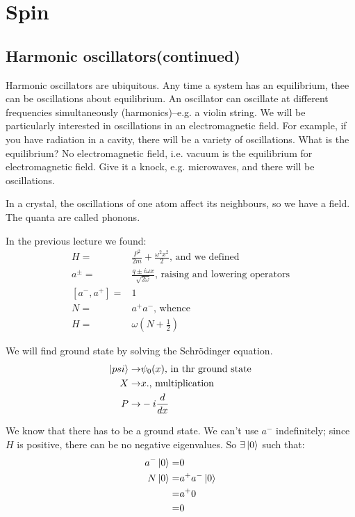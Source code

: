\documentclass[]{article}
\begin{document}
\section{Spin}

\subsection{Harmonic oscillators(continued)}

Harmonic oscillators are ubiquitous. Any time a system has an equilibrium, thee can be oscillations about equilibrium. An oscillator can oscillate at different frequencies simultaneously (harmonics)--e.g. a violin string. We will be particularly interested in oscillations in an electromagnetic field.  For example, if you have radiation in a cavity, there will be a variety of oscillations. What is the equilibrium? No electromagnetic field, i.e. vacuum is the equilibrium for electromagnetic field. Give it a knock, e.g. microwaves, and there will be oscillations.

In a crystal, the oscillations of one atom affect its neighbours, so we have a field. The quanta are called phonons.

In the previous lecture we found:
\begin{align*}
	H =& \frac{P^2}{2m} + \frac{\omega^2 x^2}{2} \text{, and we defined}\\
	a^\pm=& \frac{q \pm i \omega x}{\sqrt{2 \omega}} \text{, raising and lowering operators}\\
	[a^-,a^+]=& 1\\
	N =& a^+a^- \text{, whence}\\
	H =& \omega(N+\frac{1}{2})
\end{align*}

We will find ground state by solving the Schr\"odinger equation.
\begin{align*}
	\ket{psi} \rightarrow& \psi_0(x) \text{, in thr ground state}\\
	X \rightarrow& x. \text{, multiplication}\\
	P \rightarrow& -i \frac{d}{dx}
\end{align*}


We know that there has to be a ground state. We can't use $a^-$ indefinitely; since $H$ is positive, there can be no negative eigenvalues. So $\exists \ket{0}$ such that: 
\begin{align*}
	a^-\ket{0}=&0\\
	N\ket{0}=&a^+a^- \ket{0 }\\
	=& a^+0\\
	=&0
\end{align*}
\end{document}
